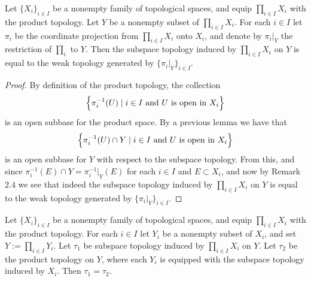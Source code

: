 \documentclass[11pt,a4paper]{article}
\begin{document}
\begin{lemma}
  Let $\{X_i\}_{i \in I}$ be a nonempty family of topological spaces, 
  and equip $\prod_{i \in I}{X_i}$ with the product topology. Let $Y$ be 
  a nonempty subset of $\prod_{i \in I}{X_i}$. For each $i \in I$ let 
  $\pi_i$ be the coordinate projection from $\prod_{i \in I}{X_i}$ onto 
  $X_i$, and denote by $\pi_i\vert_Y$ the restriction of $\prod_i$ to $Y$.
  Then the subspace topology induced by $\prod_{i \in I}{X_i}$ on $Y$ is 
  equal to the weak topology generated by $\{\pi_i \vert_Y\}_{i \in I}$.
\end{lemma}
\begin{proof}
  By definition of the product topology, the collection
  \[
    \left\{\pi_{i}^{-1}(U) \mid \text{$i \in I$ and $U$ is open in $X_i$}\right\}
  \]
  is an open subbase for the product space. By a previous lemma
  we have that
  \[
    \left\{\pi_{i}^{-1}(U) \cap Y \mid 
    \text{$i \in I$ and $U$ is open in $X_i$}\right\}
  \]
  is an open subbase for $Y$ with respect to the subspace topology.
  From this, and since $\pi_{i}^{-1}(E) \cap Y = \pi_{i}^{-1} \vert_Y(E)$
  for each $i \in I$ and $E \subset X_i$, and now by Remark $2.4$ we
  see that indeed the subspace topology induced by $\prod_{i \in I}{X_i}$ 
  on $Y$ is equal to the weak topology generated by 
  $\{\pi_i \vert_Y\}_{i \in I}$.
\end{proof}

\begin{lemma}
  Let $\{X_i\}_{i \in I}$ be a nonempty family of topological spaces, 
  and equip $\prod_{i \in I}{X_i}$ with the product topology. For each 
  $i \in I$ let $Y_i$ be a nonempty subset of $X_i$, and set 
  $Y := \prod_{i \in I}{Y_i}$. Let $\tau_1$ be subspace topology induced 
  by $\prod_{i \in I}{X_i}$ on $Y$. Let $\tau_2$ be the product topology 
  on $Y$, where each $Y_i$ is equipped with the subspace topology induced 
  by $X_i$. Then $\tau_1 = \tau_2$.
\end{lemma}
\end{document}
